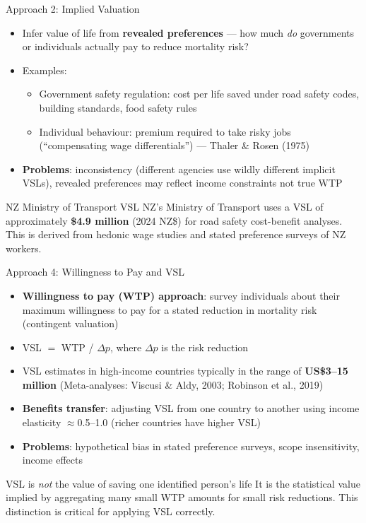 \documentclass[aspectratio=169, 12pt]{beamer}
\begin{document}
\begin{frame}{Approach 2: Implied Valuation}
  \begin{itemize}
    \item Infer value of life from \textbf{revealed preferences} --- how much \emph{do}
          governments or individuals actually pay to reduce mortality risk?
    \item Examples:
    \begin{itemize}
      \item Government safety regulation: cost per life saved under road safety codes,
            building standards, food safety rules
      \item Individual behaviour: premium required to take risky jobs (``compensating
            wage differentials'') --- Thaler \& Rosen (1975)
    \end{itemize}
    \item \textbf{Problems}: inconsistency (different agencies use wildly different implicit
          VSLs), revealed preferences may reflect income constraints not true WTP
  \end{itemize}
  \begin{exampleblock}{NZ Ministry of Transport VSL}
    NZ's Ministry of Transport uses a VSL of approximately \textbf{\$4.9 million} (2024 NZ\$)
    for road safety cost-benefit analyses. This is derived from hedonic wage studies and
    stated preference surveys of NZ workers.
  \end{exampleblock}
\end{frame}

\begin{frame}{Approach 4: Willingness to Pay and VSL}
  \begin{itemize}
    \item \textbf{Willingness to pay (WTP) approach}: survey individuals about their maximum
          willingness to pay for a stated reduction in mortality risk (contingent valuation)
    \item VSL $=$ WTP / $\Delta p$, where $\Delta p$ is the risk reduction
    \item VSL estimates in high-income countries typically in the range of \textbf{US\$3--15 million}
          (Meta-analyses: Viscusi \& Aldy, 2003; Robinson et al., 2019)
    \item \textbf{Benefits transfer}: adjusting VSL from one country to another using
          income elasticity $\approx$0.5--1.0 (richer countries have higher VSL)
    \item \textbf{Problems}: hypothetical bias in stated preference surveys, scope insensitivity,
          income effects
  \end{itemize}
  \begin{alertblock}{VSL is \emph{not} the value of saving one identified person's life}
    It is the statistical value implied by aggregating many small WTP amounts for small
    risk reductions. This distinction is critical for applying VSL correctly.
  \end{alertblock}
\end{frame}
\end{document}
